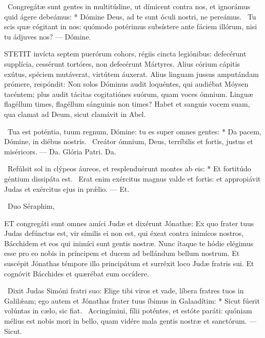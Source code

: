 \R\ Congregátæ sunt gentes in multitúdine, ut dímicent contra nos, et ignorámus quid ágere debeámus: * Dómine Deus, ad te sunt óculi nostri, ne pereámus. \V\ Tu scis quæ cógitant in nos: quómodo potérimus subsístere ante fáciem illórum, nisi tu ádjuves nos? — Dómine.


\lettrine[lines=2]{S}{TETIT} invícta septem puerórum cohors, régiis cincta legiónibus: defecérunt supplícia, cessérunt tortóres, non defecérunt Mártyres. Alius córium cápitis exútus, spéciem mutáverat, virtútem áuxerat. Alius linguam jussus amputándam prómere, respóndit: Non solos Dóminus audit loquéntes, qui audiébat Móysen tacéntem; plus audit tácitas cogitatiónes suórum, quam voces ómnium. Linguæ flagéllum times, flagéllum sánguinis non times? Habet et sanguis vocem suam, qua clamat ad Deum, sicut clamávit in Abel.

\R\ Tua est poténtia, tuum regnum, Dómine: tu es super omnes gentes: * Da pacem, Dómine, in diébus nostris. \V\ Creátor ómnium, Deus, terríbilis et fortis, justus et miséricors. — Da. Glória Patri. Da.

\R\ Refúlsit sol in clýpeos áureos, et resplenduérunt montes ab eis: * Et fortitúdo géntium dissipáta est. \V\ Erat enim exércitus magnus valde et fortis: et appropiávit Judas et exércitus ejus in prǽlio. — Et.

\R\ Duo Séraphim, 




\lettrine[lines=2]{E}{T} congregáti sunt omnes amíci Judæ et dixérunt Jónathæ: Ex quo frater tuus Judas defúnctus est, vir símilis ei non est, qui éxeat contra inimícos nostros, Bácchidem et eos qui inimíci sunt gentis nostræ. Nunc ítaque te hódie elégimus esse pro eo nobis in príncipem et ducem ad bellándum bellum nostrum. Et suscépit Jónathas témpore illo principátum et surréxit loco Judæ fratris sui. Et cognóvit Bácchides et quærébat eum occídere.

\R\ Dixit Judas Simóni fratri suo: Elige tibi viros et vade, líbera fratres tuos in Galilǽam; ego autem et Jónathas frater tuus íbimus in Galaadítim: * Sicut fúerit volúntas in cælo, sic fiat. \V\ Accingímini, fílii poténtes, et estóte paráti: quóniam mélius est nobis mori in bello, quam vidére mala gentis nostræ et sanctórum. — Sicut.

